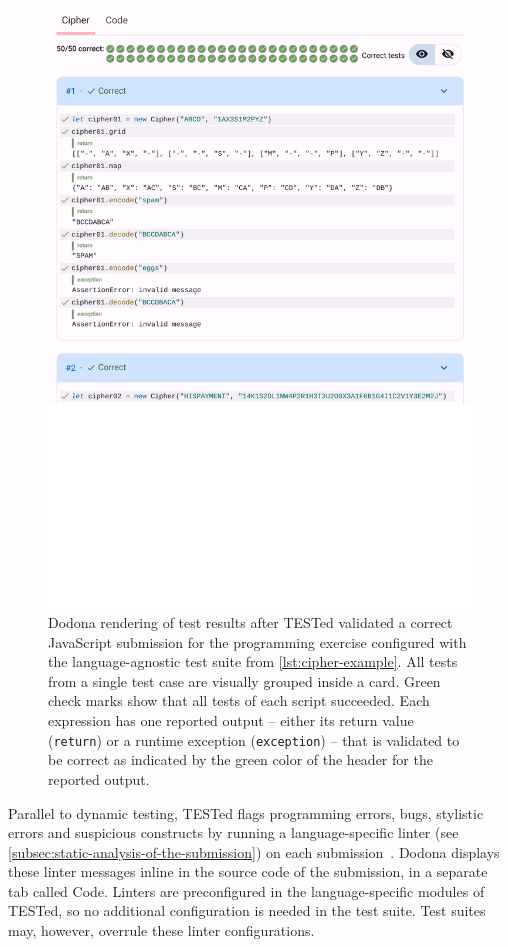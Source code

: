 \documentclass[../main]{subfiles}
\begin{document}
\begin{figure}
    \centering
    \includegraphics[width=\textwidth]{render-cipher}
    \caption{Dodona rendering of test results after TESTed validated a correct JavaScript submission for the programming exercise configured with the language-agnostic test suite from \vref{lst:cipher-example}. All tests from a single test case are visually grouped inside a card. Green check marks show that all tests of each script succeeded. Each expression has one reported output -- either its return value (\texttt{return}) or a runtime exception (\texttt{exception}) -- that is validated to be correct as indicated by the green color of the header for the reported output.\label{fig:dodona-render-cipher}}
\end{figure}

Parallel to dynamic testing, TESTed flags programming errors, bugs, stylistic errors and suspicious constructs by running a language-specific linter (see \vref{subsec:static-analysis-of-the-submission}) on each submission~\autocite{truongLearningProgramWeb2005}.
Dodona displays these linter messages inline in the source code of the submission, in a separate tab called Code.
Linters are preconfigured in the language-specific modules of TESTed, so no additional configuration is needed in the test suite.
Test suites may, however, overrule these linter configurations.
\end{document}
